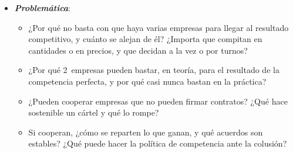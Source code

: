 \documentclass[11pt]{article}
\begin{document}
\begin{itemize}
\begin{itemize}
\begin{itemize}
    \end{itemize}
  \item {}. El título usa una palabra con 2~sentidos que conviene separar:
    \begin{itemize}
    \item \emph{por el resultado}: en organización industrial, una solución es \emph{cooperativa} () si las empresas consiguen restringir la producción y acercarse al beneficio conjunto de monopolio, y \emph{no cooperativa} (competitiva) si cada una maximiza el suyo;
    \item \emph{por el instrumento}: en teoría de juegos, un juego es \emph{cooperativo} si los jugadores pueden firmar \emph{acuerdos vinculantes} y formar coaliciones, y \emph{no cooperativo} si cada uno decide por su cuenta .
    \end{itemize}
  \item Las 2~cosas no coinciden:
    \begin{itemize}
    \item la  (\ref{sec:horizonte-infinito}) es un resultado cooperativo de un juego no cooperativo, sin contrato alguno;
    \item el  con acuerdos vinculantes (\ref{sec:cartel}) es el caso propiamente cooperativo, y el que plantea cómo repartir las ganancias (\ref{sec:reparto}).
    \end{itemize}
  \item Esta exposición usa las 2~teorías.\footnote{Es un error frecuente pensar que, como hay colusión, el juego es cooperativo. La colusión de  es un equilibrio no cooperativo: nadie puede obligar a nadie, y cada empresa cumple porque le conviene. La teoría de juegos cooperativa entra cuando el acuerdo puede hacerse cumplir y hay que decidir cómo se reparte lo ganado.}
  \end{itemize}

\item \textbf{\emph{Problemática}}:
  \begin{itemize}
  \item ¿Por qué no basta con que haya varias empresas para llegar al resultado competitivo, y cuánto se alejan de él? ¿Importa que compitan en cantidades o en precios, y que decidan a la vez o por turnos?
  \item ¿Por qué 2~empresas pueden bastar, en teoría, para el resultado de la competencia perfecta, y por qué casi nunca bastan en la práctica?
  \item ¿Pueden cooperar empresas que no pueden firmar contratos? ¿Qué hace sostenible un cártel y qué lo rompe?
  \item Si cooperan, ¿cómo se reparten lo que ganan, y qué acuerdos son estables? ¿Qué puede hacer la política de competencia ante la colusión?
  \end{itemize}


\end{itemize}
\end{document}
